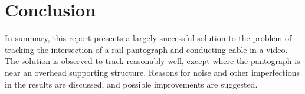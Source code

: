 \section{Conclusion}

In summary, this report presents a largely successful solution to the problem of tracking the intersection of a rail pantograph and conducting cable in a video. The solution is observed to track reasonably well, except where the pantograph is near an overhead supporting structure. Reasons for noise and other imperfections in the results are discussed, and possible improvements are suggested.

\newpage
\printbibliography[keyword={q2}]